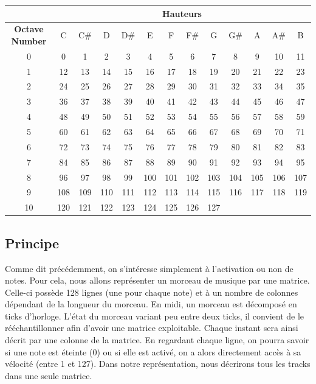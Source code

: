 \begin{tiny}
\begin{center}
\begin{tabular}{|c|c|c|c|c|c|c|c|c|c|c|c|c|}
\hline
 & \multicolumn{12}{c|}{\textbf{Hauteurs}} \\
\hline
\textbf{Octave Number} & C & C\# & D & D\# & E & F & F\# & G & G\# & A & A\# & B  \\
\hline
0 & 0 & 1 & 2 & 3 & 4 & 5 & 6 & 7 & 8 & 9 & 10 & 11  \\
\hline
1 & 12 & 13 & 14 & 15 & 16 & 17 & 18 & 19 & 20 & 21 & 22 & 23  \\
\hline
2 & 24 & 25 & 26 & 27 & 28 & 29 & 30 & 31 & 32 & 33 & 34 & 35  \\
\hline
3 & 36 & 37 & 38 & 39 & 40 & 41 & 42 & 43 & 44 & 45 & 46 & 47  \\
\hline
4 & 48 & 49 & 50 & 51 & 52 & 53 & 54 & 55 & 56 & 57 & 58 & 59  \\
\hline
5 & 60 & 61 & 62 & 63 & 64 & 65 & 66 & 67 & 68 & 69 & 70 & 71  \\
\hline
6 & 72 & 73 & 74 & 75 & 76 & 77 & 78 & 79 & 80 & 81 & 82 & 83  \\
\hline
7 & 84 & 85 & 86 & 87 & 88 & 89 & 90 & 91 & 92 & 93 & 94 & 95  \\
\hline
8 & 96 & 97 & 98 & 99 & 100 & 101 & 102 & 103 & 104 & 105 & 106 & 107  \\
\hline
9 & 108 & 109 & 110 & 111 & 112 & 113 & 114 & 115 & 116 & 117 & 118 & 119  \\
\hline
10 & 120 & 121 & 122 & 123 & 124 & 125 & 126 & 127 &   &   &   & \\
\hline
\end{tabular}
\label{tableau_notes}
\end{center}
\end{tiny}

\subsection{Principe}
Comme dit précédemment, on s'intéresse simplement à l'activation ou non de notes. Pour cela, nous allons représenter un morceau de musique par une matrice. Celle-ci possède 128 lignes (une pour chaque note) et à un nombre de colonnes dépendant de la longueur du morceau. En midi, un morceau est décomposé en ticks d'horloge. L'état du morceau variant peu entre deux ticks, il convient de le rééchantillonner afin d'avoir une matrice exploitable. Chaque instant sera ainsi décrit par une colonne de la matrice. En regardant chaque ligne, on pourra savoir si une note est éteinte (0) ou si elle est activé, on a alors directement accès à sa vélocité (entre 1 et 127). Dans notre représentation, nous décrirons tous les tracks dans une seule matrice.

